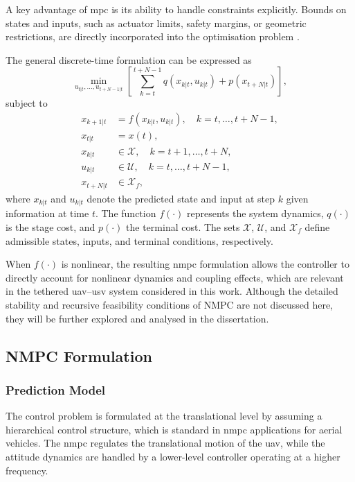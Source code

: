 A key advantage of \gls{mpc} is its ability to handle constraints explicitly. Bounds on states and inputs, such as actuator limits, safety margins, or geometric restrictions, are directly incorporated into the optimisation problem \citep{gruneNonlinearModelPredictive2011}.

The general discrete-time formulation can be expressed as
\begin{equation}
\min_{u_{t|t},\dots,u_{t+N-1|t}}
\left[
\sum_{k=t}^{t+N-1} q(x_{k|t}, u_{k|t}) + p(x_{t+N|t})
\right],
\end{equation}
subject to
\begin{align}
x_{k+1|t} &= f(x_{k|t}, u_{k|t}), \quad k = t, \dots, t+N-1, \\
x_{t|t} &= x(t), \\
x_{k|t} &\in \mathcal{X}, \quad k = t+1, \dots, t+N, \\
u_{k|t} &\in \mathcal{U}, \quad k = t, \dots, t+N-1, \\
x_{t+N|t} &\in \mathcal{X}_f ,
\end{align}
where \(x_{k|t}\) and \(u_{k|t}\) denote the predicted state and input at step \(k\) given information at time \(t\). The function \(f(\cdot)\) represents the system dynamics, \(q(\cdot)\) is the stage cost, and \(p(\cdot)\) the terminal cost. The sets \(\mathcal{X}\), \(\mathcal{U}\), and \(\mathcal{X}_f\) define admissible states, inputs, and terminal conditions, respectively.

When \(f(\cdot)\) is nonlinear, the resulting \gls{nmpc} formulation allows the controller to directly account for nonlinear dynamics and coupling effects, which are relevant in the tethered \gls{uav}--\gls{usv} system considered in this work. Although the detailed stability and recursive feasibility conditions of NMPC are not discussed here, they will be further explored and analysed in the dissertation.


\subsection{NMPC Formulation}
\subsubsection{Prediction Model}

The control problem is formulated at the translational level by assuming a hierarchical control structure, which is standard in \gls{nmpc} applications for aerial vehicles. The \gls{nmpc} regulates the translational motion of the \gls{uav}, while the attitude dynamics are handled by a lower-level controller operating at a higher frequency.

